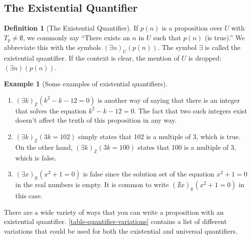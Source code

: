 \documentclass[10pt,]{book}
\theoremstyle{plain}
\theoremstyle{definition}
\newtheorem{definition}[theorem]{Definition}
\theoremstyle{definition}
\theoremstyle{definition}
\newtheorem{example}[theorem]{Example}
\theoremstyle{definition}
\begin{document}
\subsection[The Existential Quantifier]{The Existential Quantifier}\label{ss-existential}
\begin{definition}[The Existential Quantifier]\label{def-exist-quantifier}
\label{notation-12}
If \(p(n)\) is a proposition over \(U\) with \(T_p\neq \emptyset\), we commonly say ``There exists an \(n\) in \(U\)
such that \(p(n)\) (is true).'' We abbreviate this with the symbols \((\exists  n)_U(p(n))\). The symbol \(\exists\) is called the existential quantifier.   If the context is clear, the mention of \(U\) is dropped: \((\exists n)(p(n))\).%
\end{definition}
\begin{example}[Some examples of existential quantifiers]\label{ex-existential-misc}
\leavevmode%
\begin{enumerate}[label=\alph*]
\item\hypertarget{li-285}{}\((\exists k)_{\mathbb{Z}}(k ^2- k - 12 = 0)\) is another way of saying that there is an integer that solves the equation \(k^2 - k - 12 = 0\). The fact that two such integers exist doesn't affect the truth of this proposition in any way.%
\item\hypertarget{li-286}{}\((\exists k)_{\mathbb{Z}}(3k=102)\) simply states that 102 is a multiple of 3, which is true. On the other hand, \((\exists  k)_{\mathbb{Z}}(3k=100)\) states that 100 is a multiple of 3, which is false.%
\item\hypertarget{li-287}{}\((\exists x)_{\mathbb{R}}(x^2 + 1 = 0)\) is false since the solution set of the equation \(x^2+ 1 = 0\) in the real numbers is empty.  It is common to write \((\nexists x)_{\mathbb{R}}(x^2 + 1 = 0)\)  in this case.%
\end{enumerate}
%
\end{example}
There are a wide variety of ways that you can write a proposition with an existential quantifier. \hyperref[table-quantifier-variations]{\ref{table-quantifier-variations}} contains a list of different variations that could be used for both the existential and universal quantifiers.%
\typeout{************************************************}
\typeout{************************************************}
\end{document}
